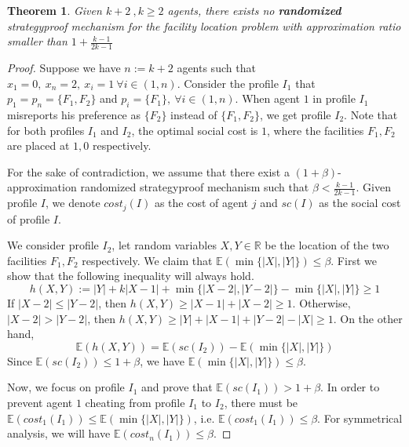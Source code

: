 \documentclass[twoside,11pt]{article}
\newtheorem{theorem}{Theorem}
\begin{document}
\begin{theorem}\label{t-min-social-lower-rand}
Given $k+2~,k \ge 2$ agents, there exists no \textbf{randomized} strategyproof mechanism for the facility location problem with approximation ratio smaller than
$1 + \frac{k-1}{2 k - 1}$
\end{theorem}
\begin{proof}
Suppose we have $n := k + 2$ agents such that $x_1 = 0,~x_n = 2,~x_i = 1 ~\forall i \in (1,n)$.
Consider the profile $I_1$ that $p_1 = p_n = \{F_1,F_2\}$ and $p_i = \{F_1\}, ~\forall i \in (1,n)$.
When agent $1$ in profile $I_1$ misreports his preference as $\{F_2\}$ instead of $\{F_1,F_2\}$, we get profile $I_2$.
Note that for both profiles $I_1$ and $I_2$, the optimal social cost is $1$, where the facilities $F_1,F_2$ are placed at $1,0$ respectively.

For the sake of contradiction, we assume that there exist a $(1+\beta)$-approximation randomized strategyproof mechanism such that $\beta <  \frac{k-1}{2 k - 1}$.
Given profile $I$, we denote $cost_j(I)$ as the cost of agent $j$ and $sc(I)$ as the social cost of profile $I$.

We consider profile $I_2$, let random variables $X,Y \in \mathbb{R}$ be the location of the two facilities $F_1,F_2$ respectively.
We claim that $\mathbb{E}(\min\{|X|,|Y|\}) \le \beta$.
First we show that the following inequality will always hold.
\begin{equation}
h(X,Y) := |Y| + k |X-1| + \min\{|X-2|,|Y-2|\} - \min\{|X|,|Y|\} \ge 1
\end{equation}
If $|X-2| \le |Y-2| $, then
 $h(X,Y) \ge  |X-1| + |X-2| \ge 1$.
Otherwise, $|X-2| > |Y-2| $, then
 $h(X,Y) \ge |Y| +  |X-1| + |Y-2| - |X| \ge 1$.
On the other hand,
$$\mathbb{E}(h(X,Y)) =
\mathbb{E}(sc(I_2)) - \mathbb{E}(\min\{|X|,|Y|\})$$
Since $\mathbb{E}(sc(I_2)) \le 1 + \beta$, we have $\mathbb{E}(\min\{|X|,|Y|\}) \le \beta$.

%
Now, we focus on profile $I_1$ and prove that
$\mathbb{E}(sc(I_1)) > 1 + \beta$.
%
In order to prevent agent $1$ cheating from profile $I_1$ to $I_2$, there must be
$\mathbb{E}(cost_1(I_1)) \le \mathbb{E}(\min\{|X|,|Y|\})$, i.e.
$\mathbb{E}(cost_1(I_1)) \le \beta$.
For symmetrical analysis, we will have
$\mathbb{E}(cost_n(I_1)) \le \beta$.


\end{proof}
\end{document}
